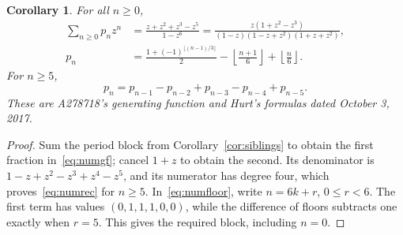 \documentclass[11pt]{article}
\newtheorem{corollary}[theorem]{Corollary}
\begin{document}
\begin{corollary}\label{cor:numerators}
For all $n\ge0$,
\begin{align}\label{eq:numgf}
 \sum_{n\ge0}p_nz^n
 &=\frac{z+z^2+z^3-z^5}{1-z^6}
 =\frac{z(1+z^2-z^3)}{(1-z)(1-z+z^2)(1+z+z^2)},\\
\label{eq:numfloor}
 p_n&=\frac{1+(-1)^{\lfloor(n-1)/3\rfloor}}2
       -\left\lfloor\frac{n+1}{6}\right\rfloor
       +\left\lfloor\frac n6\right\rfloor.
\end{align}
For $n\ge5$,
\begin{equation}\label{eq:numrec}
 p_n=p_{n-1}-p_{n-2}+p_{n-3}-p_{n-4}+p_{n-5}.
\end{equation}
These are A278718's generating function and Hurt's formulas dated
October 3, 2017.
\end{corollary}
\begin{proof}
Sum the period block from Corollary~\ref{cor:siblings} to obtain the first
fraction in~\eqref{eq:numgf}; cancel $1+z$ to obtain the second.
Its denominator is $1-z+z^2-z^3+z^4-z^5$, and its numerator has degree four,
which proves~\eqref{eq:numrec} for $n\ge5$. In~\eqref{eq:numfloor}, write
$n=6k+r$, $0\le r<6$. The first term has values $(0,1,1,1,0,0)$,
while the difference of floors subtracts one exactly when $r=5$.
This gives the required block, including $n=0$.
\end{proof}
\end{document}
